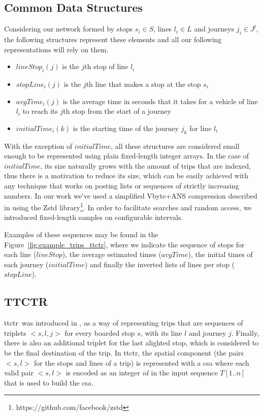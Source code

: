     \subsection{Common Data Structures}
    \label{sec:cs}
    Considering our network formed by stops $s_i \in S$, lines $l_i \in L$ and journeys $j_i \in J^l$, the following structures represent these elements and all our following representations will rely on them.
    
    \begin{itemize}
        \item $lineStop_i(j)$ is the $j$th stop of line $l_i$
        \item $stopLine_i(j)$ is the $j$th line that makes a stop at the stop $s_i$
        \item $avgTime_i(j)$ is the average time in seconds that it takes for a vehicle of line $l_i$ to reach its $j$th stop from the start of a journey
        \item $initialTime_i(k)$ is the starting time of the journey $j_k$ for line $l_i$
    \end{itemize}
    
    With the exception of $initialTime$, all these structures are considered small enough to be represented using plain fixed-length integer arrays. In the case of $initialTime$, its size naturally grows with the amount of trips that are indexed, thus there is a motivation to reduce its size, which can be easily achieved with any technique that works on posting lists or sequences of strictly increasing numbers. In our work we've used a simplified Vbyte+ANS compression described in \cite{moffat2017ans} using the Zstd library\footnote{https://github.com/facebook/zstd}. In order to facilitate searches and random access, we introduced fixed-length samples on configurable intervals.
    
    Examples of these sequences may be found in the Figure~\ref{fig:example_trips_ttctr}, where we indicate the sequence of stops for each line ($lineStop$), the average estimated times ($avgTime$), the initial times of each journey ($initialTime$) and finally the inverted lists of lines per stop ($stopLine$).
    
    \subsection{TTCTR}
    \label{sec:newctr:str:ttctr}
    \gls{ttctr}~was introduced in \cite{brisaboa2018new}, as a way of representing trips that are sequences of triplets $<s,l,j>$ for every boarded stop $s$, with its line $l$ and journey $j$. Finally, there is also an additional triplet for the last alighted stop, which is considered to be the final destination of the trip. In \gls{ttctr}, the spatial component (the pairs $<s,l>$ for the stops and lines of a trip) is represented with a \gls{csa} where each valid pair $<s,l>$ is encoded as an integer $id$ in the input sequence $T[1..n]$ that is used to build the \gls{csa}.

